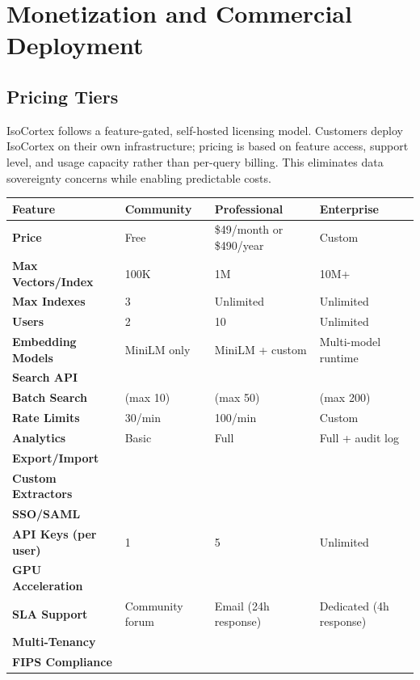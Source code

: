 \documentclass[11pt,a4paper]{article}
\newcommand{\cmark}{\textcolor{ctAccentGreen}{\ding{51}}}
\newcommand{\xmark}{\textcolor{ctAccentRed}{\ding{55}}}
\begin{document}
\section{Monetization and Commercial Deployment}

\subsection{Pricing Tiers}

IsoCortex follows a feature-gated, self-hosted licensing model. Customers deploy IsoCortex on their own infrastructure; pricing is based on feature access, support level, and usage capacity rather than per-query billing. This eliminates data sovereignty concerns while enabling predictable costs.

\begin{reqbox}
\begin{center}
\begin{tabular}{@{}p{2.5cm}p{3.5cm}p{3.5cm}p{4.5cm}@{}}
\toprule
\textbf{Feature} & \textbf{Community} & \textbf{Professional} & \textbf{Enterprise} \\
\midrule
\textbf{Price} & Free & \$49/month or \$490/year & Custom \\
\textbf{Max Vectors/Index} & 100K & 1M & 10M+ \\
\textbf{Max Indexes} & 3 & Unlimited & Unlimited \\
\textbf{Users} & 2 & 10 & Unlimited \\
\textbf{Embedding Models} & MiniLM only & MiniLM + custom & Multi-model runtime \\
\textbf{Search API} & \cmark{} & \cmark{} & \cmark{} \\
\textbf{Batch Search} & \cmark{} (max 10) & \cmark{} (max 50) & \cmark{} (max 200) \\
\textbf{Rate Limits} & 30/min & 100/min & Custom \\
\textbf{Analytics} & Basic & Full & Full + audit log \\
\textbf{Export/Import} & \cmark{} & \cmark{} & \cmark{} \\
\textbf{Custom Extractors} & \xmark{} & \cmark{} & \cmark{} \\
\textbf{SSO/SAML} & \xmark{} & \xmark{} & \cmark{} \\
\textbf{API Keys (per user)} & 1 & 5 & Unlimited \\
\textbf{GPU Acceleration} & \xmark{} & \xmark{} & \cmark{} \\
\textbf{SLA Support} & Community forum & Email (24h response) & Dedicated (4h response) \\
\textbf{Multi-Tenancy} & \xmark{} & \xmark{} & \cmark{} \\
\textbf{FIPS Compliance} & \xmark{} & \xmark{} & \cmark{} \\
\bottomrule
\end{tabular}
\end{center}
\end{reqbox}
\end{document}
